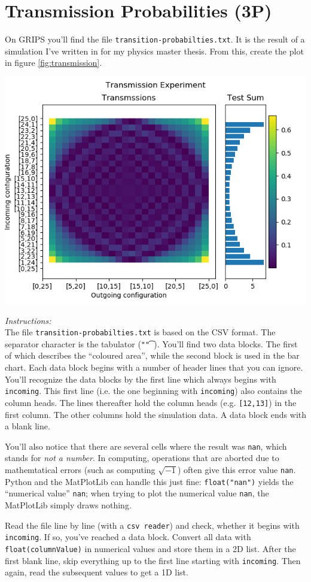\documentclass[
	english,
	fontsize=10pt,
	parskip=half,
	titlepage=true,
	DIV=12
]{scrartcl}
\newcommand*{\inPy}[1]{\texttt{#1}}
\newcommand*{\ie}{i.\;e. }
\newcommand*{\eg}{e.\;g. }
\begin{document}
\section{Transmission Probabilities (3\;P)}
On GRIPS you'll find the file \texttt{transition-probabilties.txt}. It is the result of a simulation I've written in for my physics master thesis. From this, create the plot in figure \ref{fig:transmission}.

\begin{center}
\includegraphics[width=.8\linewidth]{./task4}
\label{fig:transmission}
\end{center}

\emph{Instructions:}\\
The file \texttt{transition-probabilties.txt} is based on the CSV format. The separator character is the tabulator (\inPy{"\t"}). You'll find two data blocks. The first of which describes the \enquote{coloured area}, while the second block is used in the bar chart. Each data block begins with a number of header lines that you can ignore. You'll recognize the data blocks by the first line which always begins with \texttt{incoming}. This first line (\ie the one beginning with \texttt{incoming}) also contains the column heads. The lines thereafter hold the column heads (\eg \texttt{[12,13]}) in the first column. The other columns hold the simulation data. A data block ends with a blank line.

You'll also notice that there are several cells where the result was \texttt{nan}, which stands for \emph{not a number}. In computing, operations that are aborted due to mathemtatical errors (such as computing $\sqrt{-1}$) often give this error value \texttt{nan}. Python and the MatPlotLib can handle this just fine: \inPy{float("nan")} yields the \enquote{numerical value} \texttt{nan}; when trying to plot the numerical value \texttt{nan}, the MatPlotLib simply draws nothing.

Read the file line by line (with a \texttt{csv reader}) and check, whether it begins with \texttt{incoming}. If so, you've reached a data block. Convert all data with \inPy{float(columnValue)} in numerical values and store them in a 2D list. After the first blank line, skip everything up to the first line starting with \texttt{incoming}. Then again, read the subsequent values to get a 1D list.
\end{document}
